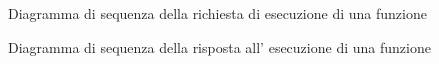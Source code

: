 \begin{figure}[H]
	\noindent
	\caption{Diagramma di sequenza della richiesta di esecuzione di una funzione}
\end{figure}
\begin{figure}[H]
	\noindent
	\caption{Diagramma di sequenza della risposta all' esecuzione di una funzione}
\end{figure}

